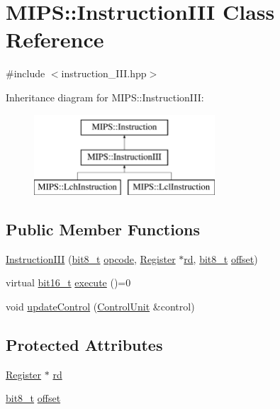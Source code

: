 \hypertarget{classMIPS_1_1InstructionIII}{}\section{M\+I\+PS\+:\+:Instruction\+I\+II Class Reference}
\label{classMIPS_1_1InstructionIII}


{\ttfamily \#include $<$instruction\+\_\+\+I\+I\+I.\+hpp$>$}

Inheritance diagram for M\+I\+PS\+:\+:Instruction\+I\+II\+:\begin{figure}[H]
\begin{center}
\leavevmode
\includegraphics[height=3.000000cm]{classMIPS_1_1InstructionIII}
\end{center}
\end{figure}
\subsection*{Public Member Functions}
\begin{DoxyCompactItemize}
\item 
\hyperlink{classMIPS_1_1InstructionIII_a0b3a67569e09bd53866536d5241a3d17}{Instruction\+I\+II} (\hyperlink{core_8hpp_a6074bae122ae7b527864eec42c728c3c}{bit8\+\_\+t} \hyperlink{classMIPS_1_1Instruction_a45cc6808b5dde8a5d41067d148b55476}{opcode}, \hyperlink{classMIPS_1_1Register}{Register} $\ast$\hyperlink{classMIPS_1_1InstructionIII_a76e7b218fc57cd2fc559bf72498090b6}{rd}, \hyperlink{core_8hpp_a6074bae122ae7b527864eec42c728c3c}{bit8\+\_\+t} \hyperlink{classMIPS_1_1InstructionIII_ad0ebd3b6e7594fc583e9a409bf99a6c7}{offset})
\item 
virtual \hyperlink{core_8hpp_adc265a970bc35995b5879784bbb3f1b7}{bit16\+\_\+t} \hyperlink{classMIPS_1_1InstructionIII_aee3071c23abc542e55b446abee766c5e}{execute} ()=0
\item 
void \hyperlink{classMIPS_1_1InstructionIII_ac2e82988e8b0b356f939d86c3de5ed59}{update\+Control} (\hyperlink{classMIPS_1_1ControlUnit}{Control\+Unit} \&control)
\end{DoxyCompactItemize}
\subsection*{Protected Attributes}
\begin{DoxyCompactItemize}
\item 
\hyperlink{classMIPS_1_1Register}{Register} $\ast$ \hyperlink{classMIPS_1_1InstructionIII_a76e7b218fc57cd2fc559bf72498090b6}{rd}
\item 
\hyperlink{core_8hpp_a6074bae122ae7b527864eec42c728c3c}{bit8\+\_\+t} \hyperlink{classMIPS_1_1InstructionIII_ad0ebd3b6e7594fc583e9a409bf99a6c7}{offset}
\end{DoxyCompactItemize}


